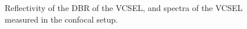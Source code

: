
	\begin{figure}[tp]
		\centering
		\caption{Reflectivity of the DBR of the VCSEL, and spectra of the VCSEL measured in the confocal setup.}
		\label{fig::dbr_vcsel}
	\end{figure}